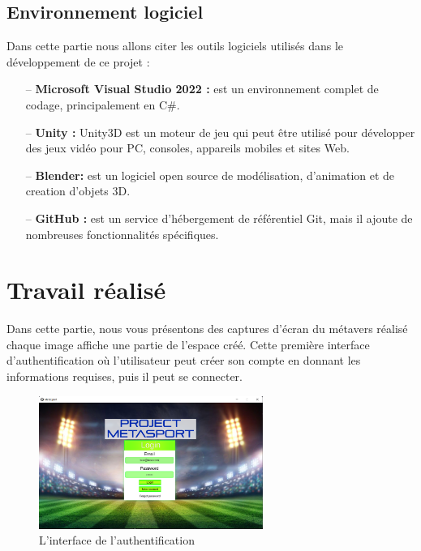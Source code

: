 \documentclass[12pt,a4paper,oneside,french]{book}
\begin{document}
\subsection{Environnement logiciel}
Dans cette partie nous allons citer les outils logiciels utilisés dans le développement de ce projet :
\begin{itemize}
\item[--] \textbf{Microsoft Visual Studio 2022 :} est un environnement complet de codage, principalement en C\#.
\item[--] \textbf{Unity :} Unity3D est un moteur de jeu qui peut être utilisé pour développer des jeux vidéo pour PC, consoles, appareils mobiles et sites Web.
\item[--] \textbf{Blender:} est un logiciel open source de modélisation, d’animation et de creation d'objets 3D.
\item[--] \textbf{GitHub :} est un service d’hébergement de référentiel Git, mais il ajoute de nombreuses fonctionnalités spécifiques.
\end{itemize}

\section{Travail réalisé}
Dans cette partie, nous vous présentons des captures d’écran du métavers réalisé chaque image
affiche une partie de l’espace créé.
\noindent
Cette première interface d’authentification où l’utilisateur peut créer son compte en donnant les
informations requises, puis il peut se connecter.
\begin{figure}[H]
    \centering
    \includegraphics[width=0.65\textwidth]{figure/login.png}
    \caption{L’interface de l’authentification}
    \label{fig:login}
\end{figure}
\noindent
\end{document}
